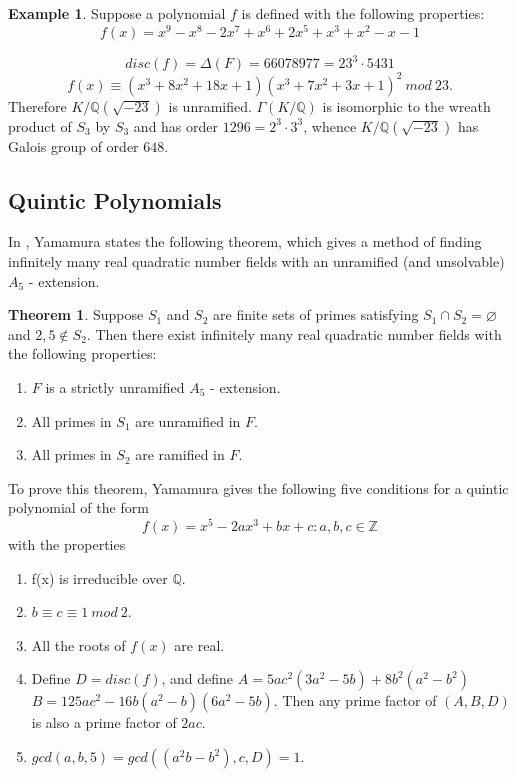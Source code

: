 \documentclass[12pt]{extarticle}
\newcommand{\Q}{\mathbb{Q}}
\newcommand{\Z}{\mathbb{Z}}
\newcommand{\<}{\langle}
\renewcommand{\>}{\rangle}
\renewcommand{\emptyset}{\varnothing}
\theoremstyle{definition}
\newtheorem{theorem}{Theorem}
\newtheorem{example}{Example}
\begin{document}
\begin{example}
    Suppose a polynomial $f$ is defined with the following properties: \begin{equation}
        f(x) =x^9 - x^8 - 2x^7 + x^6 + 2x^5 + x^3 + x^2 - x - 1
    \end{equation} \par
    \begin{equation}
        disc(f)= \Delta(F)=66078977=23^3 \cdot 5431
    \end{equation} 
    \begin{equation}
        f(x)\equiv(x^3 + 8x^2 + 18x + 1)(x^3 + 7x^2 + 3x + 1)^2\:mod\:23.
    \end{equation}
Therefore $K/\Q(\sqrt{-23})$ is unramified. $\Gamma(K/\Q)$ is isomorphic to the wreath product of $S_3$ by $S_3$ and has order $1296=2^3 \cdot 3^3$, whence $K/\Q(\sqrt{-23})$ has Galois group of order $648$.
\end{example}

\subsection{Quintic Polynomials}
In \cite{yamamura1986}, Yamamura states the following theorem, which gives a method of finding infinitely many real quadratic number fields with an unramified (and unsolvable) $A_5$ - extension. 
\begin{theorem}
    Suppose $S_1$ and $S_2$ are finite sets of primes satisfying $S_1 \cap S_2 = \emptyset$ and $2,5 \notin S_2$. Then there exist infinitely many real quadratic number fields with the following properties: \begin{enumerate}
        \item $F$ is a strictly unramified $A_5$ - extension.
        \item All primes in $S_1$ are unramified in $F$.
        \item All primes in $S_2$ are ramified in $F$.
      
    \end{enumerate}  \label{thm:yama_ramifying}
\end{theorem}
To prove this theorem, Yamamura gives the following five conditions for a quintic polynomial of the form \begin{equation}
    f(x)=x^5-2ax^3+bx+c: a,b,c \in \Z
\end{equation} with the properties
\begin{enumerate}
\item f(x) is irreducible over $\Q$.
\item $b \equiv c \equiv 1 \: mod \: 2  $.
\item All the roots of $f(x)$ are real.
\item Define $D = disc(f)$, and define
$A= 5ac^2(3a^2-5b)+8b^2(a^2-b^2)$
$B = 125ac^2-16b(a^2-b)(6a^2-5b)$.
Then any prime factor of $(A,B,D)$ is also a prime factor of $2ac$. 

\item $gcd(a,b,5) =gcd((a^2b-b^2),c,D)=1$.
{}
\end{enumerate} 
\end{document}
